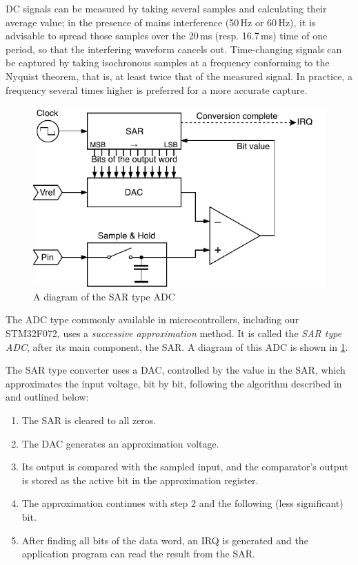 \gls{DC} signals can be measured by taking several samples and calculating their average value; in the presence of mains interference (50\,Hz or 60\,Hz), it is advisable to spread those samples over the 20\,ms (resp. 16.7\,ms) time of one period, so that the interfering waveform cancels out. Time-changing signals can be captured by taking isochronous samples at a frequency conforming to the Nyquist theorem, that is, at least twice that of the measured signal. In practice, a frequency several times higher is preferred for a more accurate capture.

\begin{figure}
	\centering
	\includegraphics[scale=1] {img/sar-adc.pdf}
	\caption{\label{fig:adc_sar}A diagram of the SAR type ADC}
\end{figure}

The \gls{ADC} type commonly available in microcontrollers, including our STM32F072, uses a \textit{successive approximation} method. It is called the \textit{SAR type \gls{ADC}}, after its main component, the \gls{SAR}. A diagram of this \gls{ADC} is shown in \cref{fig:adc_sar}.

The \gls{SAR} type converter uses a \gls{DAC}, controlled by the value in the \gls{SAR}, which approximates the input voltage, bit by bit, following the algorithm described in~\cite{adc-sar} and outlined below:

\begin{enumerate}
	\item The \gls{SAR} is cleared to all zeros.
	\item The \gls{DAC} generates an approximation voltage.
	\item Its output is compared with the sampled input, and the comparator's output is stored as the active bit in the approximation register.
	\item The approximation continues with step 2 and the following (less significant) bit.
	\item After finding all bits of the data word, an \gls{IRQ} is generated and the application program can read the result from the \gls{SAR}.
\end{enumerate}


